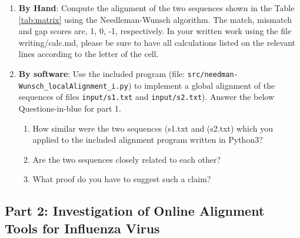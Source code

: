 \begin{enumerate}
	\item \textbf{By Hand}: Compute the alignment of the two sequences shown in the Table \ref{tab:matrix} using the Needleman-Wunsch algorithm. The match, mismatch and gap scores are, 1, 0, -1, respectively. In your written work using the file {writing/calc.md}, please be sure to have all calculations listed on the relevant lines according to the letter of the cell. 
	
	\item \textbf{By software}: Use the included program (file: {\tt src/needman-Wunsch\_localAlignment\_i.py}) to implement a global alignment of the sequences of files {\tt input/s1.txt} and {\tt input/s2.txt}). Answer the below \color{blue} Questions-in-blue \color{black} for part 1. 
	
	\begin{enumerate}
	  \item \color{blue} How similar were the two sequences (s1.txt and (s2.txt) which you applied to the included alignment program written in Python3? \color{black}

	  \item \color{blue} Are the two sequences closely related to each other? \color{black}

      \item \color{blue} What proof do you have to suggest such a claim? \color{black}
	\end{enumerate}
	
	
	\end{enumerate}


\vspace*{-.1in}
\subsection*{Part 2:  Investigation of Online Alignment Tools for Influenza Virus}
\vspace*{-.1in} 








